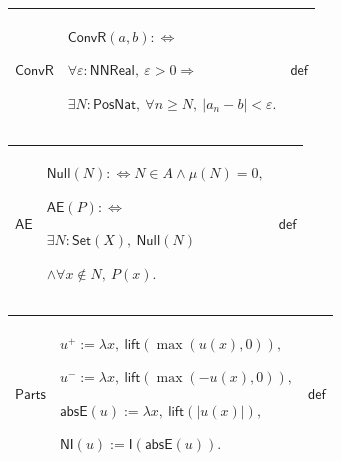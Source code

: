 \documentclass[11pt]{amsart}
\newlength{\FTCThreeColumnBody}
\begin{document}
{\begin{tabular}{|@{}>{\centering\arraybackslash}m{0.251968\FTCThreeColumnBody}|>{\centering\arraybackslash}m{0.590551\FTCThreeColumnBody}|>{\centering\arraybackslash}m{0.157480\FTCThreeColumnBody}|}
\end{tabular}%
\par\setlength{\parskip}{0pt}\nointerlineskip
\noindent
\begin{tabular}{|@{}>{\centering\arraybackslash}m{0.251968\FTCThreeColumnBody}|>{\centering\arraybackslash}m{0.590551\FTCThreeColumnBody}|>{\centering\arraybackslash}m{0.157480\FTCThreeColumnBody}|}\hline
\hypertarget{dctdef:ConvR}{$\displaystyle \textsf{ConvR}$} & $\displaystyle \textsf{ConvR}(a,b):\Longleftrightarrow$\par
$\displaystyle \forall\varepsilon:\textsf{NNReal},\ \varepsilon>0\Rightarrow$\par
$\displaystyle \exists N:\textsf{PosNat},\ \forall n\ge N,\ |a_n-b|<\varepsilon.$ & $\displaystyle \textsf{def}$\\ \hline
\end{tabular}%
\par\setlength{\parskip}{0pt}\nointerlineskip
\noindent
\begin{tabular}{|@{}>{\centering\arraybackslash}m{0.251968\FTCThreeColumnBody}|>{\centering\arraybackslash}m{0.590551\FTCThreeColumnBody}|>{\centering\arraybackslash}m{0.157480\FTCThreeColumnBody}|}\hline
\hypertarget{dctdef:AE}{$\displaystyle \textsf{AE}$} & $\displaystyle \textsf{Null}(N):\Longleftrightarrow N\in A\land\mu(N)=0,$\par
$\displaystyle \textsf{AE}(P):\Longleftrightarrow$\par
$\displaystyle \exists N:\textsf{Set}(X),\ \textsf{Null}(N)$\par
$\displaystyle \land\forall x\notin N,\ P(x).$ & $\displaystyle \textsf{def}$\\ \hline
\end{tabular}%
\par\setlength{\parskip}{0pt}\nointerlineskip
\noindent
\begin{tabular}{|@{}>{\centering\arraybackslash}m{0.251968\FTCThreeColumnBody}|>{\centering\arraybackslash}m{0.590551\FTCThreeColumnBody}|>{\centering\arraybackslash}m{0.157480\FTCThreeColumnBody}|}\hline
\hypertarget{dctdef:Parts}{$\displaystyle \textsf{Parts}$} & $\displaystyle u^+:=\lambda x,\ \textsf{lift}(\max(u(x),0)),$\par
$\displaystyle u^-:=\lambda x,\ \textsf{lift}(\max(-u(x),0)),$\par
$\displaystyle \textsf{absE}(u):=\lambda x,\ \textsf{lift}(|u(x)|),$\par
$\displaystyle \textsf{NI}(u):=\textsf{I}(\textsf{absE}(u)).$ & $\displaystyle \textsf{def}$\\ \hline

\end{tabular}}
\end{document}

